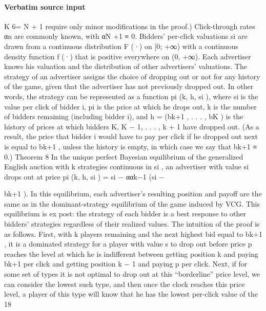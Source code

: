 \documentclass[10pt]{article}
\begin{document}
\paragraph{Verbatim source input}
\begin{ReviewVerbatim}
K 6= N + 1 require only minor modifications in the proof.) Click-through rates αn are commonly
known, with αN +1 ≡ 0. Bidders’ per-click valuations si are drawn from a continuous distribution
F (·) on [0; +∞) with a continuous density function f (·) that is positive everywhere on (0, +∞).
Each advertiser knows his valuation and the distribution of other advertisers’ valuations.
The strategy of an advertiser assigns the choice of dropping out or not for any history of the
game, given that the advertiser has not previously dropped out. In other words, the strategy can be
represented as a function pi (k, h, si ), where si is the value per click of bidder i, pi is the price at which
he drops out, k is the number of bidders remaining (including bidder i), and h = (bk+1 , . . . , bK ) is
the history of prices at which bidders K, K − 1, . . . , k + 1 have dropped out. (As a result, the
price that bidder i would have to pay per click if he dropped out next is equal to bk+1 , unless the
history is empty, in which case we say that bk+1 ≡ 0.)
Theorem 8 In the unique perfect Bayesian equilibrium of the generalized English auction with
k
strategies continuous in si , an advertiser with value si drops out at price pi (k, h, si ) = si − ααk−1
(si −

bk+1 ). In this equilibrium, each advertiser’s resulting position and payoff are the same as in the
dominant-strategy equilibrium of the game induced by VCG. This equilibrium is ex post: the strategy
of each bidder is a best response to other bidders’ strategies regardless of their realized values.
The intuition of the proof is as follows. First, with k players remaining and the next highest
bid equal to bk+1 , it is a dominated strategy for a player with value s to drop out before price p
reaches the level at which he is indifferent between getting position k and paying bk+1 per click and
getting position k − 1 and paying p per click. Next, if for some set of types it is not optimal to drop
out at this “borderline” price level, we can consider the lowest such type, and then once the clock
reaches this price level, a player of this type will know that he has the lowest per-click value of the
18


\end{ReviewVerbatim}
\end{document}

